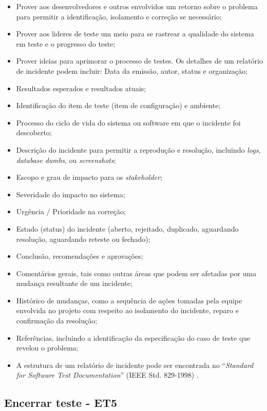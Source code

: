 \begin{itemize}
    \item Prover aos desenvolvedores e outros envolvidos um retorno sobre o problema para permitir a identificação, isolamento e correção se necessário;
    \item Prover aos lideres de teste um meio para se rastrear a qualidade do sistema em teste e o progresso do teste;
    \item Prover ideias para aprimorar o processo de testes. Os detalhes de um relatório de incidente podem incluir: Data da emissão, autor, status e organização;
    \item Resultados esperados e resultados atuais;
    \item Identificação do item de teste (item de configuração) e ambiente;
    \item Processo do ciclo de vida do sistema ou software em que o incidente foi descoberto;
    \item Descrição do incidente para permitir a reprodução e resolução, incluindo \textit{logs}, \textit{database} \textit{dumbs}, ou \textit{screenshots};
    \item Escopo e grau de impacto para os \textit{stakeholder};
    \item Severidade do impacto no sistema;
    \item Urgência / Prioridade na correção;
    \item Estado (status) do incidente (aberto, rejeitado, duplicado, aguardando resolução, aguardando reteste ou fechado);
    \item Conclusão, recomendações e aprovações;
    \item Comentários gerais, tais como outras áreas que podem ser afetadas por uma mudança resultante de um incidente;
    \item Histórico de mudanças, como a sequência de ações tomadas pela equipe envolvida no projeto com respeito ao isolamento do incidente, reparo e confirmação da resolução;
    \item Referências, incluindo a identificação da especificação do caso de teste que revelou o problema;
    \item A estrutura de um relatório de incidente pode ser encontrada no “\textit{Standard for Software Test Documentation}” (IEEE Std. 829-1998) \cite{ieee829}.
\end{itemize}

\subsection{Encerrar teste - ET5}
\label{sec:guiaet5}

